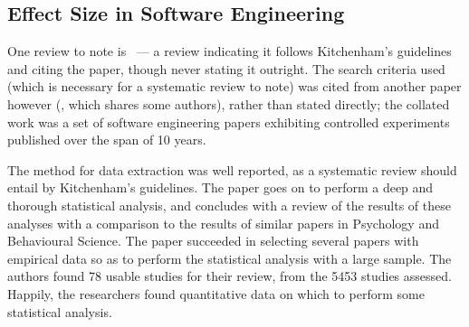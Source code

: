 \subsection{Effect Size in Software Engineering}
One review to note is~\citet*{Kampenes2007} --- a review indicating it follows Kitchenham's guidelines and citing the paper, though never stating it outright. The search criteria used (which is necessary for a systematic review to note) was cited from another paper however (\cite{Sjoberg2005}, which shares some authors), rather than stated directly; the collated work was a set of software engineering papers exhibiting controlled experiments published over the span of 10 years.\par

The method for data extraction was well reported, as a systematic review should entail by Kitchenham's guidelines. The paper goes on to perform a deep and thorough statistical analysis, and concludes with a review of the results of these analyses with a comparison to the results of similar papers in Psychology and Behavioural Science. The paper succeeded in selecting several papers with empirical data so as to perform the statistical analysis with a large sample. The authors found 78 usable studies for their review, from the 5453 studies assessed. Happily, the researchers found quantitative data on which to perform some statistical analysis.\par
